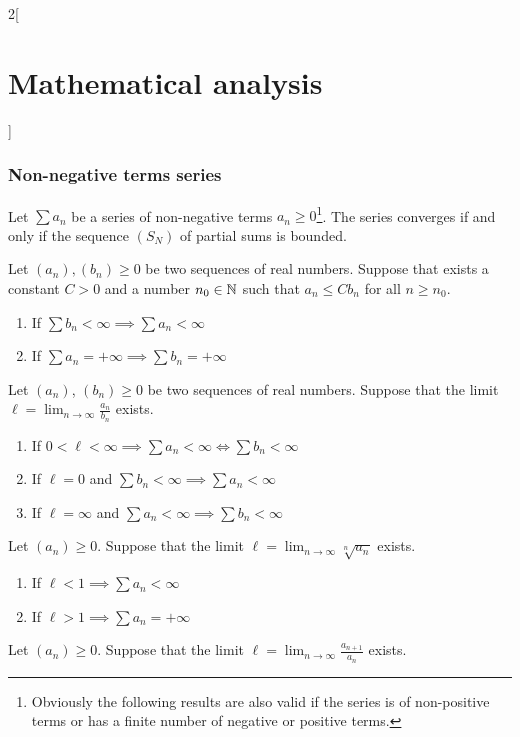 \documentclass[../../../main_math.tex]{subfiles}
\begin{document}
\begin{multicols}{2}[\section{Mathematical analysis}]
  \subsubsection{Non-negative terms series}
  \begin{theorem}
    Let $\sum a_n$ be a series of non-negative terms $a_n\geq 0$\footnote{Obviously the following results are also valid if the series is of non-positive terms or has a finite number of negative or positive terms.}. The series converges if and only if the sequence $(S_N)$ of partial sums is bounded.
  \end{theorem}
  \begin{theorem}
    Let $(a_n),(b_n)\geq 0$ be two sequences of real numbers. Suppose that exists a constant $C>0$ and a number $n_0\in\mathbb{N} $ such that $a_n\leq Cb_n$ for all $n\geq n_0$.
    \begin{enumerate}
      \item If $\sum b_n<\infty\implies\sum a_n<\infty$
      \item If $\sum a_n=+\infty\implies\sum b_n=+\infty$
    \end{enumerate}
  \end{theorem}
  \begin{theorem}
    Let $(a_n)$, $(b_n)\geq 0$ be two sequences of real numbers. Suppose that the limit $\ell=\displaystyle\lim_{n\to\infty}\frac{a_n}{b_n}$ exists.
    \begin{enumerate}
      \item If $0<\ell<\infty\implies\sum a_n<\infty\iff\sum b_n<\infty$
      \item If $\ell=0$ and $\sum b_n<\infty\implies\sum a_n<\infty$
      \item If $\ell=\infty$ and $\sum a_n<\infty\implies\sum b_n<\infty$
    \end{enumerate}
  \end{theorem}
  \begin{theorem}
    Let $(a_n)\geq 0$. Suppose that the limit $\displaystyle \ell=\lim_{n\to\infty}\sqrt[n]{a_n}$ exists.
    \begin{enumerate}
      \item If $\ell<1\implies\sum a_n<\infty$
      \item If $\ell>1\implies\sum a_n=+\infty$
    \end{enumerate}
  \end{theorem}
  \begin{theorem}
    Let $(a_n)\geq 0$. Suppose that the limit $\displaystyle \ell=\lim_{n\to\infty}\frac{a_{n+1}}{a_n}$ exists.

\end{theorem}
\end{multicols}
\end{document}

